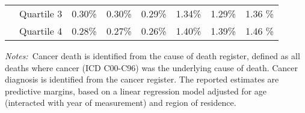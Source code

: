 \begin{table}[htbp]
\begin{threeparttable}
\begin{tabular}{@{}l*{6}{S[table-format={}1.2{\%}]}@{}}
            ~~Quartile 3                & 0.30\%      & 0.30\%      & 0.29\% & 1.34\%      & 1.29\%  & 1.36 \%  \tabularnewline%
            ~~Quartile 4                & 0.28\%      & 0.27\%      & 0.26\% & 1.40\%      & 1.39\%  & 1.46 \%  \tabularnewline%
            \bottomrule%
        \end{tabular}
        \begin{tablenotes}\footnotesize\emph{Notes:~}Cancer death is identified from the cause of death register, defined as all deaths where cancer (ICD C00-C96) was the underlying cause of death. Cancer diagnosis is identified from the cancer register. The reported estimates are predictive margins, based on a linear regression model adjusted for age (interacted with year of measurement) and region of residence.\end{tablenotes}
    \end{threeparttable}
\end{table}
